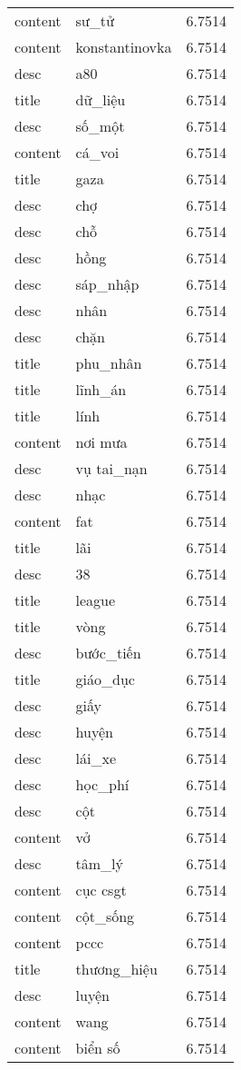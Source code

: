 \documentclass{article}
\begin{document}
\begin{tabular}{lll}
content & sư\_tử & 6.7514\\
content & konstantinovka & 6.7514\\
desc & a80 & 6.7514\\
title & dữ\_liệu & 6.7514\\
desc & số\_một & 6.7514\\
content & cá\_voi & 6.7514\\
title & gaza & 6.7514\\
desc & chợ & 6.7514\\
desc & chỗ & 6.7514\\
desc & hồng & 6.7514\\
desc & sáp\_nhập & 6.7514\\
desc & nhân & 6.7514\\
desc & chặn & 6.7514\\
title & phu\_nhân & 6.7514\\
title & lĩnh\_án & 6.7514\\
title & lính & 6.7514\\
content & nơi mưa & 6.7514\\
desc & vụ tai\_nạn & 6.7514\\
desc & nhạc & 6.7514\\
content & fat & 6.7514\\
title & lãi & 6.7514\\
desc & 38 & 6.7514\\
title & league & 6.7514\\
title & vòng & 6.7514\\
desc & bước\_tiến & 6.7514\\
title & giáo\_dục & 6.7514\\
desc & giấy & 6.7514\\
desc & huyện & 6.7514\\
desc & lái\_xe & 6.7514\\
desc & học\_phí & 6.7514\\
desc & cột & 6.7514\\
content & vở & 6.7514\\
desc & tâm\_lý & 6.7514\\
content & cục csgt & 6.7514\\
content & cột\_sống & 6.7514\\
content & pccc & 6.7514\\
title & thương\_hiệu & 6.7514\\
desc & luyện & 6.7514\\
content & wang & 6.7514\\
content & biển số & 6.7514\\

\end{tabular}
\end{document}

